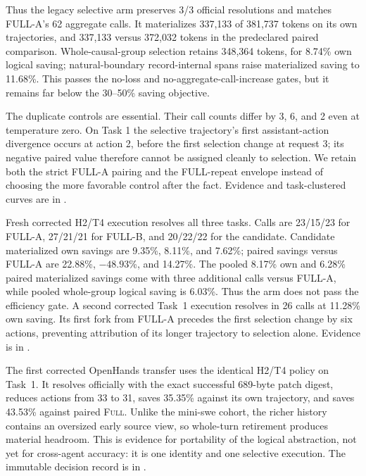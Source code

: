 \documentclass[11pt]{article}
\begin{document}
Thus the legacy selective arm preserves 3/3 official resolutions and matches
FULL-A's 62 aggregate calls. It materializes 337,133 of 381,737 tokens on its
own trajectories, and 337,133 versus 372,032 tokens in the predeclared paired
comparison. Whole-causal-group selection retains 348,364 tokens, for 8.74\%
own logical saving; natural-boundary record-internal spans raise materialized
saving to 11.68\%. This passes the no-loss and no-aggregate-call-increase gates, but
it remains far below the 30--50\% saving objective.

The duplicate controls are essential. Their call counts differ by 3, 6, and
2 even at temperature zero. On Task 1 the selective trajectory's first
assistant-action divergence occurs at action 2, before the first selection
change at request 3; its negative paired value therefore cannot be assigned
cleanly to selection. We retain both the strict FULL-A pairing and the
FULL-repeat envelope instead of choosing the more favorable control after the
fact. Evidence and task-clustered curves are in
.

Fresh corrected H2/T4 execution resolves all three tasks.  Calls are
23/15/23 for FULL-A, 27/21/21 for FULL-B, and 20/22/22 for the candidate.
Candidate materialized own savings are 9.35\%, 8.11\%, and 7.62\%; paired savings versus
FULL-A are 22.88\%, $-48.93$\%, and 14.27\%.  The pooled 8.17\% own and 6.28\%
paired materialized savings come with three additional calls versus FULL-A,
while pooled whole-group logical saving is 6.03\%.  Thus the arm does
not pass the efficiency gate.  A second corrected Task~1 execution resolves in
26 calls at 11.28\% own saving.  Its first fork from FULL-A precedes the first
selection change by six actions, preventing attribution of its longer
trajectory to selection alone.  Evidence is in
.

The first corrected OpenHands transfer uses the identical H2/T4 policy on
Task~1.  It resolves officially with the exact successful 689-byte patch
digest, reduces actions from 33 to 31, saves 35.35\% against its own trajectory,
and saves 43.53\% against paired \textsc{Full}.  Unlike the mini-swe cohort,
the richer history contains an oversized early source view, so whole-turn
retirement produces material headroom.  This is evidence for portability of
the logical abstraction, not yet for cross-agent accuracy: it is one identity
and one selective execution.  The immutable decision record is in
.
\end{document}
